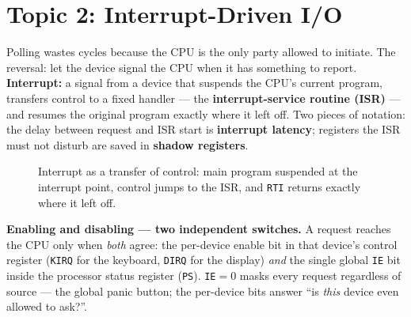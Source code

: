 \documentclass[11pt]{article}
\begin{document}
\section{Topic 2: Interrupt-Driven I/O}

Polling wastes cycles because the CPU is the only party allowed to initiate. The reversal: let the device signal the CPU when it has something to report. \textbf{Interrupt:} a signal from a device that suspends the CPU's current program, transfers control to a fixed handler --- the \textbf{interrupt-service routine (ISR)} --- and resumes the original program exactly where it left off. Two pieces of notation: the delay between request and ISR start is \textbf{interrupt latency}; registers the ISR must not disturb are saved in \textbf{shadow registers}.

\begin{figure}[h]
  \centering
  \caption{Interrupt as a transfer of control: main program suspended at the interrupt point, control jumps to the ISR, and \texttt{RTI} returns exactly where it left off.}
  \label{fig:interrupt-transfer}
\end{figure}

\textbf{Enabling and disabling --- two independent switches.} A request reaches the CPU only when \emph{both} agree: the per-device enable bit in that device's control register (\texttt{KIRQ} for the keyboard, \texttt{DIRQ} for the display) \emph{and} the single global \texttt{IE} bit inside the processor status register (\texttt{PS}). \texttt{IE}$=0$ masks every request regardless of source --- the global panic button; the per-device bits answer ``is \emph{this} device even allowed to ask?''.
\end{document}
